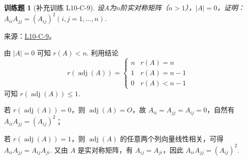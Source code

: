 \documentclass[UTF8,12pt,a4paper,fontset=fandol]{ctexart}
\newtheorem{exercise}{训练题}[section]
\begin{document}
\begin{exercise}[补充训练 L10-C-9]\label{prob:L10-C-9}
设$A$为$n$阶实对称矩阵（$n>1$），$|A|=0$，证明：$A_{ii}A_{jj}=(A_{ij})^2(i,j=1,\ldots,n)$.
\end{exercise}
\noindent 来源：\href{https://github.com/yhwu-is/Linear-Algebra-Left-Undone/blob/new/%E8%AE%B2%E4%B9%89/%E4%B8%93%E9%A2%98/10%20%E8%A1%8C%E5%88%97%E5%BC%8F.tex}{L10-C-9}。
\begin{solve}
由 $|A| = 0$ 可知 $r(A) < n$. 利用结论
            \[
                r(\operatorname{adj}(A))=\begin{cases}
                    n & r(A)=n     \\
                    1 & r(A)=n-1   \\
                    0 & r(A) < n-1
                \end{cases}
            \]
            可知 $r(\operatorname{adj}(A)) \leqslant 1$.

            若 $r(\operatorname{adj}(A)) = 0$，则 $\operatorname{adj}(A) = O$，故 $A_{ii} = A_{jj} = A_{ij} = 0$，自然有 $A_{ii}A_{jj}=(A_{ij})^2$；

            若 $r(\operatorname{adj}(A)) = 1$，则 $\operatorname{adj}(A)$ 的任意两个列向量线性相关，可得 $A_{ii}A_{jj} = A_{ij}A_{ji}$. 又由 $A$ 是实对称矩阵，有 $A_{ij} = A_{ji}$，因此 $A_{ii}A_{jj} = (A_{ij})^2$.
\end{solve}
\end{document}
